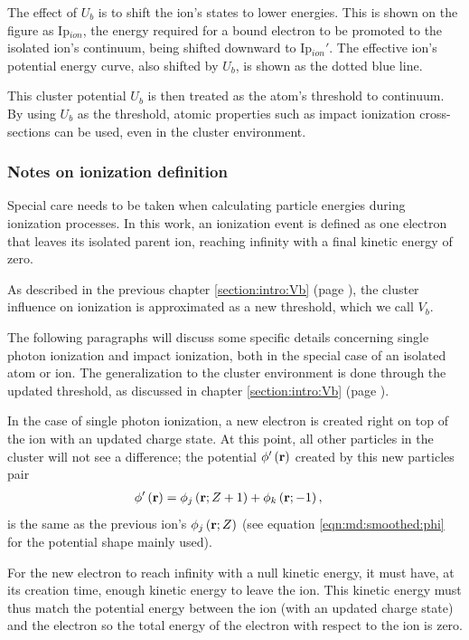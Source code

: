 The effect of $U_b$ is to shift the ion's states to lower energies. This is
shown on the figure as Ip$_{ion}$, the energy required for a bound electron
to be promoted to the isolated ion's continuum, being shifted downward to
Ip$_{ion}'$. The effective ion's potential energy curve, also shifted by $U_b$,
is shown as the dotted blue line.

This cluster potential $U_b$ is then treated as the atom's threshold
to continuum. By using $U_b$ as the threshold, atomic properties such as
impact ionization cross-sections can be used, even in the cluster environment.



\subsubsection{Notes on ionization definition}
\label{section:intro:mechanisms:notes}

Special care needs to be taken when calculating particle energies during
ionization processes. In this work, an ionization event is defined as one
electron that leaves its isolated parent ion, reaching infinity with a final
kinetic energy of zero.

As described in the previous chapter \ref{section:intro:Vb} (page
\pageref{section:intro:Vb}), the cluster
influence on ionization is approximated as a new threshold, which we call $V_b$.

The following paragraphs will discuss some specific details concerning single
photon ionization and impact ionization, both in the special case of an isolated
atom or ion. The generalization to the cluster environment is done through the
updated threshold, as discussed in chapter \ref{section:intro:Vb} (page
\pageref{section:intro:Vb}).



In the case of single photon ionization, a new electron is created right on top
of the ion with an updated charge state. At this point, all other particles in
the cluster will not see a difference; the potential $\phi'\left( \textbf{r} \right)$ created by
this new particles pair
\begin{align}
\phi'\left( \textbf{r} \right) & = \phi_{j}\left( \textbf{r};Z+1 \right) + \phi_{k}\left( \textbf{r};-1 \right),
\end{align}
is the same as the previous ion's $\phi_{j}\left( \textbf{r};Z \right)$ (see equation
\eqref{eqn:md:smoothed:phi} for the potential shape mainly used).


For the new electron to reach infinity with a null kinetic energy, it
must have, at its creation time, enough kinetic energy to leave the ion. This
kinetic energy must thus match the potential energy between the ion (with an
updated charge state) and the electron so the total energy of the electron with
respect to the ion is zero.

